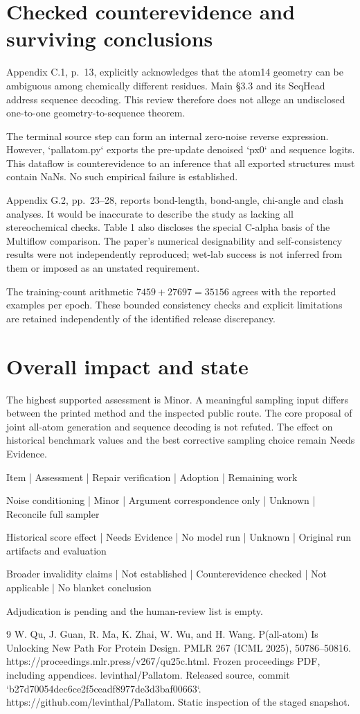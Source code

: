 \documentclass[10pt]{article}
\begin{document}
\section*{Checked counterevidence and surviving conclusions}
Appendix C.1, p. 13, explicitly acknowledges that the atom14 geometry can be ambiguous among chemically different residues. Main §3.3 and its SeqHead address sequence decoding. This review therefore does not allege an undisclosed one-to-one geometry-to-sequence theorem.\par
The terminal source step can form an internal zero-noise reverse expression. However, `pallatom.py` exports the pre-update denoised `px0` and sequence logits. This dataflow is counterevidence to an inference that all exported structures must contain NaNs. No such empirical failure is established.\par
Appendix G.2, pp. 23–28, reports bond-length, bond-angle, chi-angle and clash analyses. It would be inaccurate to describe the study as lacking all stereochemical checks. Table 1 also discloses the special C-alpha basis of the Multiflow comparison. The paper’s numerical designability and self-consistency results were not independently reproduced; wet-lab success is not inferred from them or imposed as an unstated requirement.\par
The training-count arithmetic \(7459+27697=35156\) agrees with the reported examples per epoch. These bounded consistency checks and explicit limitations are retained independently of the identified release discrepancy.\par
\section*{Overall impact and state}
The highest supported assessment is Minor. A meaningful sampling input differs between the printed method and the inspected public route. The core proposal of joint all-atom generation and sequence decoding is not refuted. The effect on historical benchmark values and the best corrective sampling choice remain Needs Evidence.\par
Item | Assessment | Repair verification | Adoption | Remaining work\par
Noise conditioning | Minor | Argument correspondence only | Unknown | Reconcile full sampler\par
Historical score effect | Needs Evidence | No model run | Unknown | Original run artifacts and evaluation\par
Broader invalidity claims | Not established | Counterevidence checked | Not applicable | No blanket conclusion\par
Adjudication is pending and the human-review list is empty.\par
9 W. Qu, J. Guan, R. Ma, K. Zhai, W. Wu, and H. Wang. P(all-atom) Is Unlocking New Path For Protein Design. PMLR 267 (ICML 2025), 50786–50816. https://proceedings.mlr.press/v267/qu25c.html. Frozen proceedings PDF, including appendices. levinthal/Pallatom. Released source, commit `b27d70054dec6ce2f5ceadf8977de3d3baf00663`. https://github.com/levinthal/Pallatom. Static inspection of the staged snapshot.\par
\end{document}
